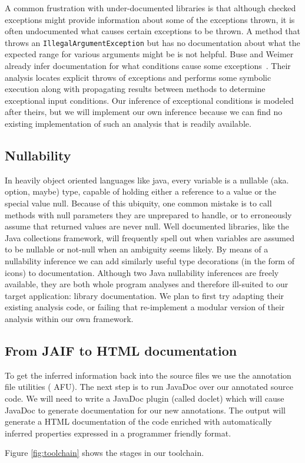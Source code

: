 A common frustration with under-documented libraries is that although checked
exceptions might provide information about some of the exceptions thrown, it is
often undocumented what causes certain exceptions to be thrown.  A method that
throws an \texttt{IllegalArgumentException} but has no documentation about what
the expected range for various arguments might be is not helpful.  Buse and
Weimer already infer documentation for what conditions cause some
exceptions~\cite{autodoc}.  Their analysis locates explicit throws of exceptions
and performs some symbolic execution along with propagating results between
methods to determine exceptional input conditions.  Our inference of exceptional
conditions is modeled after
theirs, but we will implement our own inference because we can find no existing
implementation of such an analysis that is readily available.

\subsection{Nullability}
\label{sec:Nullability}
In heavily object oriented languages like java, every variable is a nullable (aka. option, maybe) type, capable of holding either a reference to a value or the special value null.  Because of this ubiquity, one common mistake is to call methods with null parameters they are unprepared to handle, or to erroneously assume that returned values are never null.  Well documented libraries, like the Java collections framework, will frequently spell out when variables are assumed to be nullable or not-null when an ambiguity seems likely.  By means of a nullability inference\cite{NIT,NonNullTypeInference} we can add similarly useful type decorations (in the form of icons) to documentation.  Although two Java nullability inferences are freely available, they are both whole program analyses and therefore ill-suited to our target application: library documentation.  We plan to first try adapting their existing analysis code, or failing that re-implement a modular version of their analysis within our own framework.

\subsection{From JAIF to HTML documentation}
\label{sec:jaif2html}

To get the inferred information back into the source files we use the annotation 
file utilities (\cite{AFU} AFU). The next step is to run JavaDoc over our
annotated source code. We will need to write a JavaDoc plugin (called doclet) which will
cause JavaDoc to generate documentation for our new annotations. The output will
generate a HTML documentation of the code enriched with automatically inferred
properties expressed in a programmer friendly format.

Figure \ref{fig:toolchain} shows the stages in our toolchain.

